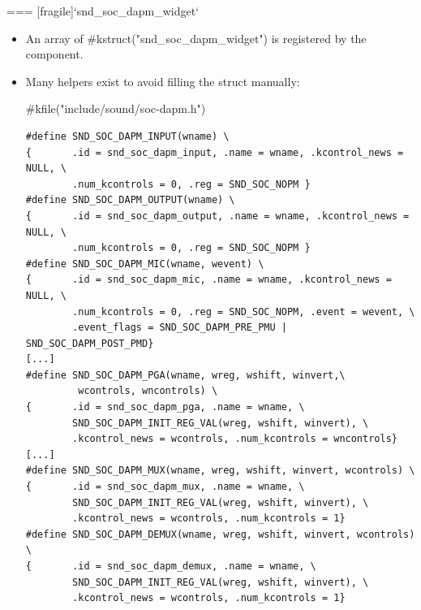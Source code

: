 === [fragile]{`snd_soc_dapm_widget`}
  \begin{itemize}
  \item An array of #kstruct("snd_soc_dapm_widget") is registered
    by the component.
  \item Many helpers exist to avoid filling the struct manually:
  \begin{block}{#kfile("include/sound/soc-dapm.h")}
    \fontsize{8}{7}\selectfont
    \begin{verbatim}
#define SND_SOC_DAPM_INPUT(wname) \
{       .id = snd_soc_dapm_input, .name = wname, .kcontrol_news = NULL, \
        .num_kcontrols = 0, .reg = SND_SOC_NOPM }
#define SND_SOC_DAPM_OUTPUT(wname) \
{       .id = snd_soc_dapm_output, .name = wname, .kcontrol_news = NULL, \
        .num_kcontrols = 0, .reg = SND_SOC_NOPM }
#define SND_SOC_DAPM_MIC(wname, wevent) \
{       .id = snd_soc_dapm_mic, .name = wname, .kcontrol_news = NULL, \
        .num_kcontrols = 0, .reg = SND_SOC_NOPM, .event = wevent, \
        .event_flags = SND_SOC_DAPM_PRE_PMU | SND_SOC_DAPM_POST_PMD}
[...]
#define SND_SOC_DAPM_PGA(wname, wreg, wshift, winvert,\
         wcontrols, wncontrols) \
{       .id = snd_soc_dapm_pga, .name = wname, \
        SND_SOC_DAPM_INIT_REG_VAL(wreg, wshift, winvert), \
        .kcontrol_news = wcontrols, .num_kcontrols = wncontrols}
[...]
#define SND_SOC_DAPM_MUX(wname, wreg, wshift, winvert, wcontrols) \
{       .id = snd_soc_dapm_mux, .name = wname, \
        SND_SOC_DAPM_INIT_REG_VAL(wreg, wshift, winvert), \
        .kcontrol_news = wcontrols, .num_kcontrols = 1}
#define SND_SOC_DAPM_DEMUX(wname, wreg, wshift, winvert, wcontrols) \
{       .id = snd_soc_dapm_demux, .name = wname, \
        SND_SOC_DAPM_INIT_REG_VAL(wreg, wshift, winvert), \
        .kcontrol_news = wcontrols, .num_kcontrols = 1}
    \end{verbatim}
  \end{block}
  \end{itemize}


